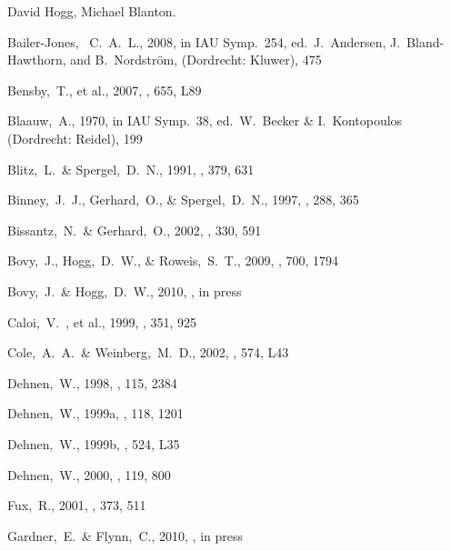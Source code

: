 \documentclass[12pt,preprint]{aastex}
\newcommand{\etal}{et al.}
\begin{document}
\acknowledgements David Hogg, Michael Blanton.

\begin{thebibliography}{}


  Bailer-Jones, ~C.~A.~L., 2008,
  in IAU Symp.~254, ed.~J.~Andersen, J.~Bland-Hawthorn, and B.~Nordstr\"{o}m, (Dordrecht: Kluwer), 475  

\bibitem[Bensby \etal(2007)]{Bensby07a}
  Bensby,~T., \etal, 2007,
  \apjl, 655, L89

  Blaauw,~A., 1970, in IAU Symp.~38, ed.~W.~Becker \& I.~Kontopoulos (Dordrecht: Reidel), 199

  Blitz,~L.~\& Spergel,~D.~N., 1991, \apj, 379, 631

  Binney,~J.~J., Gerhard,~O., \& Spergel,~D.~N., 1997,
  \mnras, 288, 365

  Bissantz,~N.~\& Gerhard,~O., 2002,
  \mnras, 330, 591

 Bovy,~J., Hogg,~D.~W., \& Roweis,~S.~T., 2009,
  \apj, 700, 1794

 Bovy,~J.~\& Hogg,~D.~W., 2010,
  \apj, in press

\bibitem[Caloi \etal(1999)]{caloi99a}
  Caloi,~V.~, \etal, 1999,
  \aap, 351, 925

  Cole,~A.~A.~\& Weinberg,~M.~D., 2002,
  \apjl, 574, L43

Dehnen,~W., 1998, \aj, 115, 2384


  Dehnen,~W., 1999a, \aj, 118, 1201

  Dehnen,~W., 1999b, \apj, 524, L35

  Dehnen,~W., 2000, \aj, 119, 800

  Fux,~R., 2001,
  \aap, 373, 511

  Gardner,~E.~\& Flynn,~C., 2010,
  \mnras, in press


\end{thebibliography}
\end{document}
